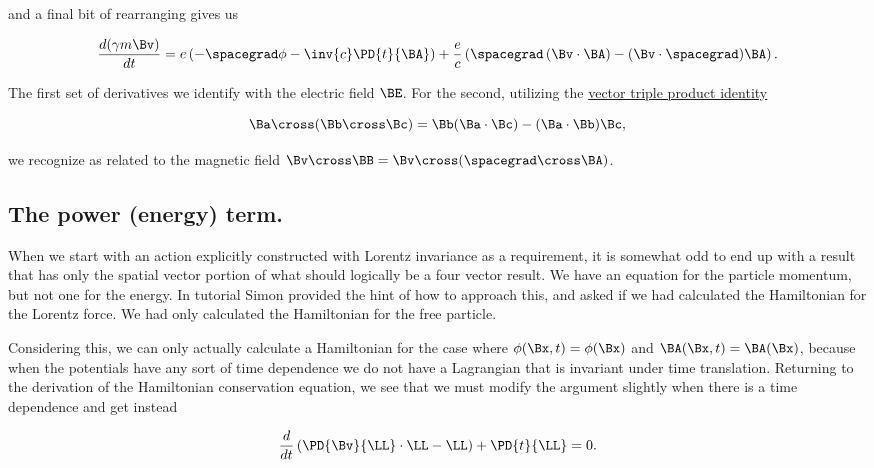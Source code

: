and a final bit of rearranging gives us

\begin{equation}\label{eqn:lorentzForceHamiltonian:120}
\frac{d(\gamma m \Bv)}{dt} =
e \left( -\spacegrad \phi - \inv{c} \PD{t}{\BA}
\right)
+ \frac{e}{c} \left( 
\spacegrad \left( \Bv \cdot \BA \right) - (\Bv \cdot \spacegrad) \BA
\right).
\end{equation}

The first set of derivatives we identify with the electric field $\BE$.  For the second, utilizing the \href{http://en.wikipedia.org/wiki/Triple_product#Vector_triple_product}{vector triple product identity} \cite{wiki:tripleProduct}

\begin{equation}\label{eqn:lorentzForceHamiltonian:140}
\Ba \cross (\Bb \cross \Bc) = \Bb (\Ba \cdot \Bc) - (\Ba \cdot \Bb) \Bc,
\end{equation}

we recognize as related to the magnetic field $\Bv \cross \BB = \Bv \cross (\spacegrad \cross \BA)$.

\subsection{The power (energy) term.}

When we start with an action explicitly constructed with Lorentz invariance as a requirement, it is somewhat odd to end up with a result that has only the spatial vector portion of what should logically be a four vector result.  We have an equation for the particle momentum, but not one for the energy.  In tutorial Simon provided the hint of how to approach this, and asked if we had calculated the Hamiltonian for the Lorentz force.   We had only calculated the Hamiltonian for the free particle.

Considering this, we can only actually calculate a Hamiltonian for the case where $\phi(\Bx, t) = \phi(\Bx)$ and $\BA(\Bx, t) = \BA(\Bx)$, because when the potentials have any sort of time dependence we do not have a Lagrangian that is invariant under time translation.  Returning to the derivation of the Hamiltonian conservation equation, we see that we must modify the argument slightly when there is a time dependence and get instead

\begin{equation}\label{eqn:lorentzForceHamiltonian:160}
\frac{d}{dt} \left( \PD{\Bv}{\LL} \cdot \LL - \LL \right) + \PD{t}{\LL} = 0.
\end{equation}

